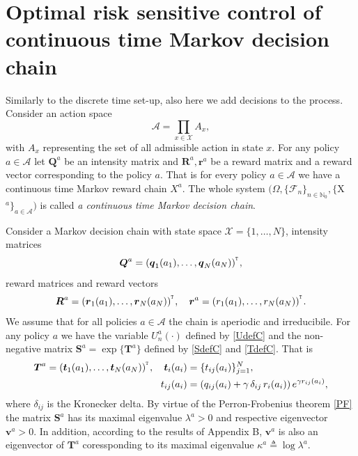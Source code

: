 \section{Optimal risk sensitive control of continuous time Markov decision chain}
\vspace{4 mm}

Similarly to the discrete time set-up, also here we add decisions to the process. Consider an action space
\[\mathcal{A}=\prod_{x\in\mathcal{X}}A_x,\]
 with $A_x$ representing the set of all admissible action in state $x$. For any policy $a\in\mathcal{A}$ let $\bm{Q}^a$ be an intensity matrix and $\bm{R}^a, \bm{r}^a$ be a reward matrix and a reward vector corresponding to the policy $a$. That is for every policy $a\in\mathcal{A}$ we have a continuous time Markov reward chain $X^a$.
 The whole system $(\Omega,\{\mathcal{F}_n\}_{n\in\mathbb{N}_0},\{$X$^a\}_{a\in\mathcal{A}})$ is called {\em a continuous time Markov decision chain}.

Consider a Markov decision chain with state space $\mathcal{X}=\{1,\dots,N\}$, intensity matrices
\[\mbox{\boldmath{$Q$}}^a=(\mbox{\boldmath{$q$}}_1(a_1),\dots,\mbox{\boldmath{$q$}}_N(a_N))^{^{_\texttt T}},\] 
reward matrices and reward vectors
\[\mbox{\boldmath{$R$}}^a=(\mbox{\boldmath{$r$}}_1(a_1),\dots,\mbox{\boldmath{$r$}}_N(a_N))^{^{_\texttt T}},\quad \mbox{\boldmath{$r$}}^a=(r_1(a_1),\dots,r_N(a_N))^{^{_\texttt T}}.\] 
We assume that for all policies $a\in\mathcal{A}$ the chain is aperiodic and irreducibile. 
For any policy $a$ we have the variable $U_n^a(\cdot)$ defined by \eqref{UdefC} and the non-negative matrix  $\bm{S}^{a}=\exp\{\bm{T}^a\}$ defined by \eqref{SdefC} and \eqref{TdefC}. That is
\begin{align*}
\mbox{\boldmath{$T$}}^a=(\mbox{\boldmath{$t$}}_1(a_1),\dots,\mbox{\boldmath{$t$}}_N(a_N))^{^{_\texttt T}}, \quad \mbox{\boldmath{$t$}}_i(a_i)&=\{t_{ij}(a_i)\}_{j=1}^{N},\\
 t_{ij}(a_i)&=(q_{ij}(a_i)+\gamma\,\delta_{ij}\,r_i(a_i)) \,e^{\gamma r_{ij}(a_i)},
\end{align*}
where $\delta_{ij}$ is the Kronecker delta. By virtue of the Perron-Frobenius theorem \ref{PF} the matrix $\bm{S}^a$ has its maximal eigenvalue $\lambda^a>0$ and respective eigenvector $\bm{v}^{a}>0$. In addition, according to the results of Appendix B, $\bm{v}^{a}$ is also an eigenvector of $\bm{T}^a$ coressponding to its maximal eigenvalue $\kappa^a\triangleq\log\lambda^a$.


